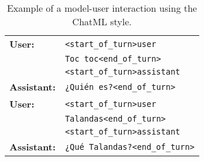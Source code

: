\begin{table}[ht!]
    \setlength{\tabcolsep}{6pt}
    \centering
    \footnotesize   
    \begin{tabular}{ll}
    \toprule
    \vspace{0.2cm}
    \textbf{User:} & {\color{blue}\texttt{<start\_of\_turn>user}} \vspace{-0.2cm} \\
    & \texttt{Toc toc}{\color{blue}\texttt{<end\_of\_turn>}} \\
    & {\color{blue}\texttt{<start\_of\_turn>assistant}} \vspace{0.1cm} \\
    \textbf{Assistant:} & \texttt{¿Quién es?}{\color{blue}\texttt{<end\_of\_turn>}} \vspace{0.1cm} \\
    \textbf{User:} & {\color{blue}\texttt{<start\_of\_turn>user}} \\
    & \texttt{Talandas}{\color{blue}\texttt{<end\_of\_turn>}} \\
    & {\color{blue}\texttt{<start\_of\_turn>assistant}} \vspace{0.1cm} \\
    \textbf{Assistant:} & \texttt{¿Qué Talandas?}{\color{blue}\texttt{<end\_of\_turn>}} \vspace{0.1cm} \\
    \bottomrule
    \end{tabular}
    \caption{Example of a model-user interaction using the ChatML style.}
    \label{tab:chatml}
    \vspace{-0.5cm}
\end{table}


